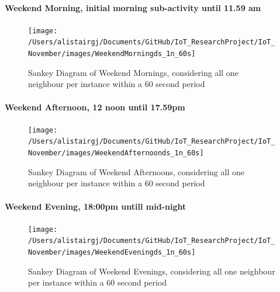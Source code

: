 \documentclass[11pt,]{article}
\let\oldparagraph\paragraph
\renewcommand{\paragraph}[1]{\oldparagraph{#1}\mbox{}}
\begin{document}
\pagebreak

\hypertarget{weekend-morning-initial-morning-sub-activity-until-11.59-am}{%
\paragraph{Weekend Morning, initial morning sub-activity until 11.59
am}\label{weekend-morning-initial-morning-sub-activity-until-11.59-am}}

\begin{figure}[H]

{\centering \texttt{[image: /Users/alistairgj/Documents/GitHub/IoT\_ResearchProject/IoT\_November/images/WeekendMorningds\_1n\_60s]} 

}

\caption{Sankey Diagram of Weekend Mornings, considering all one neighbour per instance within a 60 second period}\label{fig:sankey_WeekendMorningds_1n_60s}
\end{figure}

\hypertarget{weekend-afternoon-12-noon-until-17.59pm}{%
\paragraph{Weekend Afternoon, 12 noon until
17.59pm}\label{weekend-afternoon-12-noon-until-17.59pm}}

\begin{figure}[H]

{\centering \texttt{[image: /Users/alistairgj/Documents/GitHub/IoT\_ResearchProject/IoT\_November/images/WeekendAfternoonds\_1n\_60s]} 

}

\caption{Sankey Diagram of Weekend Afternoons, considering all one neighbour per instance within a 60 second period}\label{fig:sankey_WeekendAfternoonds_1n_60s}
\end{figure}

\pagebreak

\hypertarget{weekend-evening-1800pm-untill-mid-night}{%
\paragraph{Weekend Evening, 18:00pm untill
mid-night}\label{weekend-evening-1800pm-untill-mid-night}}

\begin{figure}[H]

{\centering \texttt{[image: /Users/alistairgj/Documents/GitHub/IoT\_ResearchProject/IoT\_November/images/WeekendEveningds\_1n\_60s]} 

}

\caption{Sankey Diagram of Weekend Evenings, considering all one neighbour per instance within a 60 second period}\label{fig:sankey_WeekendEveningds_1n_60s}
\end{figure}
\end{document}
